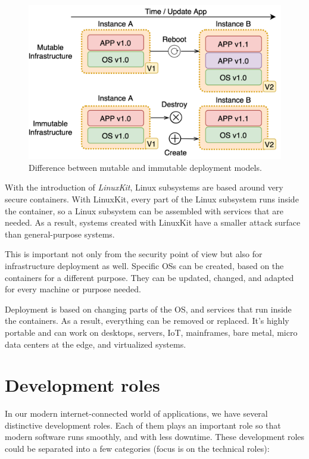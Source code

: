 \begin{figure}[H]
	\begin{center}
		\includegraphics[scale=1]{images/Figure12.png}
	\end{center}
	\vspace{-0.6cm}
	\caption{Difference between mutable and immutable deployment models.}
	\label{fig:fig12}
\end{figure}

\noindent
With the introduction of \textit{LinuxKit}, Linux subsystems are based around very secure containers. With LinuxKit, every part of the Linux subsystem runs inside the container, so a Linux subsystem can be assembled with services that are needed. As a result, systems created with LinuxKit have a smaller attack surface~\cite{abs-1802-10375} than general-purpose systems. 

This is important not only from the security point of view but also for infrastructure deployment as well. Specific OSs can be created, based on the containers for a different purpose. They can be updated, changed, and adapted for every machine or purpose needed.

Deployment is based on changing parts of the OS, and services that run inside the containers. As a result, everything can be removed or replaced. It's highly portable and can work on desktops, servers, IoT, mainframes, bare metal, micro data centers at the edge, and virtualized systems.
%
%
\section{Development roles}\label{sec:dev_roles}
%
In our modern internet-connected world of applications, we have several distinctive development roles. Each of them plays an important role so that modern software runs smoothly, and with less downtime. These development roles could be separated into a few categories (focus is on the technical roles):

